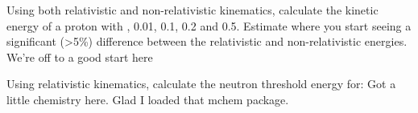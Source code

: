 \documentclass{hw}
\author{J.R. Powers-Luhn}
\date{2016-08-30}
\title{Homework #2}
\begin{document}
	Using both relativistic and non-relativistic kinematics, calculate the kinetic energy of a proton with , 0.01, 0.1, 0.2 and 0.5. Estimate where you start seeing a significant (>5\%) difference between the relativistic and non-relativistic energies.
\solution
	We're off to a good start here

	Using relativistic kinematics, calculate the neutron threshold energy for: 
\solution
	Got a little chemistry here. Glad I loaded that mchem package.
\end{document}
